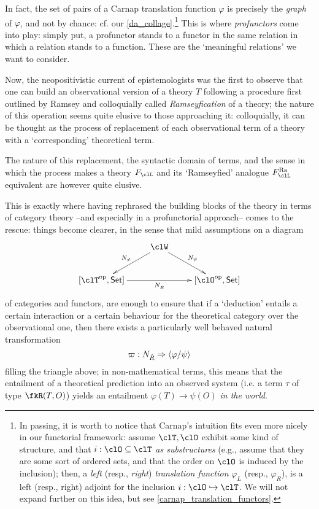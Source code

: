 In fact, the set of pairs of a Carnap translation function $\varphi$ is precisely the \emph{graph} of $\varphi$, and not by chance: cf. our \autoref{da_collage}.\footnote{In passing, it is worth to notice that Carnap's intuition fits even more nicely in our functorial framework: assume $\clT, \clO$ exhibit some kind of structure, and that $i : \clO\subseteq\clT$ \emph{as substructures} (e.g., assume that they are some sort of ordered sets, and that the order on $\clO$ is induced by the inclusion); then, a \emph{left} (resp., \emph{right}) \emph{translation function} $\varphi_L$ (resp., $\varphi_R$), is a left (resp., right) adjoint for the inclusion $i : \clO\hookrightarrow \clT$. We will not expand further on this idea, but see \autoref{carnap_translation_functors}.} This is where \emph{profunctors} come into play: simply put, a profunctor stands to a functor in the same relation in which a relation stands to a function. These are the `meaningful relations' we want to consider.

Now, the neopositivistic current of epistemologists was the first to observe that one can build an observational version of a theory $T$ following a procedure first outlined by Ramsey \cite{ramsey1931foundations} and colloquially called \emph{Ramseyfication} of a theory; the nature of this operation seems quite elusive to those approaching it: colloquially, it can be thought as the process of replacement of each observational term of a theory with a `corresponding' theoretical term. 

The nature of this replacement, the syntactic domain of terms, and the sense in which the process makes a theory $F_\clL$ and its `Ramseyfied' analogue $F_\clL^\text{Ra}$ equivalent are however quite elusive.

This is exactly where having rephrased the building blocks of the theory in terms of category theory --and especially in a profunctorial approach-- comes to the rescue: things become clearer, in the sense that mild assumptions on a diagram
\[ \vcenter{\xymatrix{
  & \clW \ar[dl]_{N_\phi} \ar[dr]^{N_\psi} & \\
  [\clT^\op,\Set] \ar[rr]_{N_{\hat R}} && [\clO^\op,\Set]
  }} \notag\]
of categories and functors, are enough to ensure that if a `deduction' entails a certain interaction or a certain behaviour for the theoretical category over the observational one, then there exists a particularly well behaved natural transformation
\[ \varpi : N_{\hat R} \Rightarrow \langle \varphi/\psi\rangle\notag \]
filling the triangle above; in non\hyp{}mathematical terms, this means that the entailment of a theoretical prediction into an observed system (i.e. a term $\tau$ of type $\fkR(T,O)$) yields an entailment $\varphi(T) \to \psi(O)$ \emph{in the world}. 

